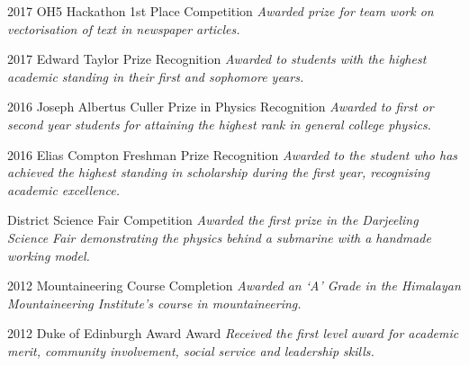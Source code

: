 \documentclass[]{friggeri-cv}
\begin{document}
\begin{entrylist}
    \entry
    {2017}
    {OH5 Hackathon 1st Place}
    {Competition}
    {\emph{Awarded prize for team work on vectorisation of text in newspaper articles.}\\}
    
    \entry
    {2017}
    {Edward Taylor Prize}
    {Recognition}
    {\emph{Awarded to students with the highest academic standing in their first and sophomore years.}\\}
    
     \entry
    {2016}
    {Joseph Albertus Culler Prize in Physics}
    {Recognition}
    { \emph{Awarded to first or second year students for attaining the highest rank in general college physics. }\\}



    \entry
    {2016}
    {Elias Compton Freshman Prize}
    {Recognition}
    { \emph{Awarded to the student who has achieved the highest standing in scholarship during the first year, recognising academic excellence. }\\}

    \end{entrylist}
   \begin{entrylist}
    {District Science Fair}
    {Competition}
    {\emph{Awarded the first prize in the Darjeeling Science Fair demonstrating the physics behind a submarine with a handmade working model.\\}}

    \end{entrylist}
   \begin{entrylist}
    \entry
    {2012}
    {Mountaineering Course}
    {Completion}
    { \emph{Awarded an ‘A’ Grade in the Himalayan Mountaineering Institute’s course in mountaineering.}\\}
    
      \entry
    {2012}
    {Duke of Edinburgh Award}
    {Award}
    { \emph{Received the first level award for academic merit, community involvement, social service and leadership skills.}\\}
    
\end{entrylist}


\newpage
\end{document}
